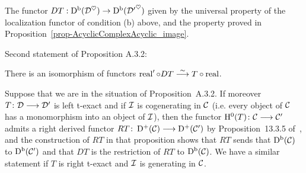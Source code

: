 \begin{definition}
\label{def-derived}
\leanok 
{}

The functor $DT:\operatorname{\mathrm{D}^b}(\mathcal{D}^\heartsuit)\to\operatorname{\mathrm{D}^b}({\mathcal{D}'}^\heartsuit)$ given by the universal property of the 
localization functor of condition (b) above, and the property proved in Proposition~\ref{prop-AcyclicComplexAcyclic_image}.


\end{definition}


Second statement of Proposition A.3.2:

\begin{definition}
\label{def-derived_comp}
\leanok 
{}

There is an isomorphism of functors $\operatorname{real}'\circ DT\stackrel{\sim}{\longrightarrow} T\circ\operatorname{real}$.

\end{definition}



\begin{remark}
Suppose that we are in the situation of Proposition~A.3.2.
If moreover $T\colon \mathcal{D}\longrightarrow\mathcal{D}'$ is left t-exact and if $\mathcal{I}$ is cogenerating in $\mathcal{C}$ (i.e. every object of $\mathcal{C}$ has a monomorphism into an object of $\mathcal{I}$), then the functor
$\mathrm{H}^0(T)\colon \mathcal{C}\longrightarrow\mathcal{C}'$ admits a right derived functor $RT\colon \operatorname{\mathrm{D}^+}(\mathcal{C})\longrightarrow\operatorname{\mathrm{D}^+}(\mathcal{C}')$ by Proposition~13.3.5 of~\cite{KS1}, and the construction of $RT$ in that proposition shows that
$RT$ sends that $\operatorname{\mathrm{D}^b}(\mathcal{C})$ to $\operatorname{\mathrm{D}^b}(\mathcal{C}')$ and that $DT$ is the restriction of $RT$ to $\operatorname{\mathrm{D}^b}(\mathcal{C})$. We have a similar statement if $T$ is right t-exact and $\mathcal{I}$ is generating in $\mathcal{C}$.

\label{rmk_der_fil1}
\end{remark}

